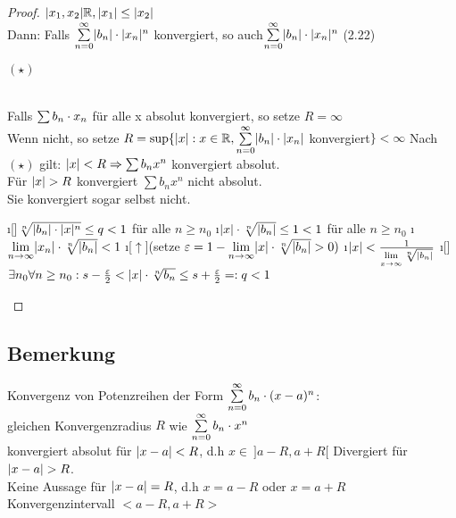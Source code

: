 \begin{proof}
$\lvert x_1,x_2 \rvert \mathbb{R}, \lvert x_1 \rvert \leq \lvert x_2 \rvert$\\
Dann: Falls $\sum\limits_{n=0}^{\infty} \lvert b_n \rvert \cdot \lvert x_n \rvert^n$ konvergiert, so auch$ \sum\limits_{n=0}^{\infty} \lvert b_n \rvert \cdot \lvert x_n \rvert^n$ (2.22) \begin{huge}
$(\star)$
\end{huge}\\
Falls $\sum b_n \cdot x_n$ für alle x absolut konvergiert, so setze $R= \infty$\\
Wenn nicht, so setze $R = \sup \{\lvert x \rvert:x\in \mathbb{R}, \sum\limits_{n=0}^{\infty} \lvert b_n \rvert\cdot \lvert x_n \rvert $ konvergiert$ \} < \infty$
Nach $(\star)$ gilt: $\lvert x \rvert < R \Rightarrow \sum b_nx^n$ konvergiert absolut.\\
Für $\lvert x \rvert > R$ konvergiert $\sum b_nx^n$ nicht absolut.\\
Sie konvergiert sogar selbst nicht. \\
\begin{enumerate}[$\Leftrightarrow$]
\i[]$\sqrt[n]{\lvert b_n \rvert \cdot \lvert x \rvert^n} \leq q < 1 $ für alle $n \geq n_0$
\i $\lvert x \rvert \cdot \sqrt[n]{\lvert b_n \rvert} \leq 1 < 1$ für alle $n \geq n_0$
\i $\lim\limits_{n \rightarrow \infty} \lvert x_n \rvert \cdot \sqrt[n]{\lvert b_n \rvert} < 1$
\i[$\uparrow$](setze $\varepsilon = 1 - \lim\limits_{n \rightarrow \infty} \lvert x \rvert \cdot \sqrt[n]{\lvert b_n \rvert} > 0)$
\i $\lvert x \rvert < \frac{1}{\lim\limits_{x \rightarrow \infty} \sqrt[n]{\lvert b_n \rvert}}$
\i[] $\exists n_0 \forall n \geq n_0 : s - \frac{\varepsilon}{2} < \lvert x \rvert \cdot \sqrt[n]{b_n} \leq s + \frac{\varepsilon}{2} =: q < 1$
\end{enumerate} 
\end{proof}
\subsection{Bemerkung}
Konvergenz von Potenzreihen der Form $\sum\limits_{n=0}^{\infty} b_n \cdot (x-a)^n$:\\
gleichen Konvergenzradius $R$ wie $\sum\limits_{n=0}^{\infty} b_n \cdot x^n$\\
konvergiert absolut für $\lvert x-a \rvert < R$, d.h $x \in \ ]a-R,  a+R[$
Divergiert für $\lvert x-a \rvert > R$.\\
Keine Aussage für $\lvert x-a \rvert = R$, d.h $ x = a-R$ oder $x = a+R$\\
Konvergenzintervall $<a-R,a+R>$
